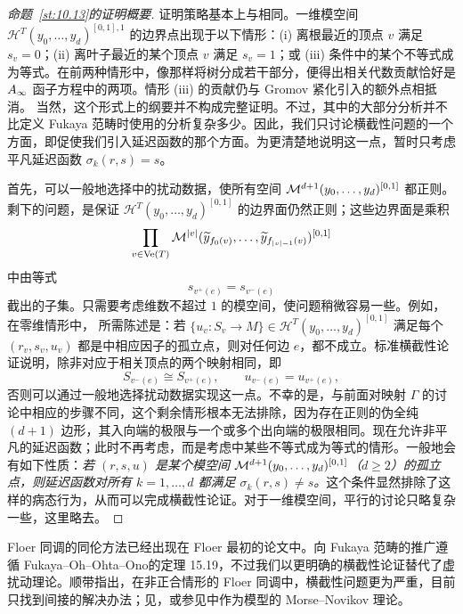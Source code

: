 \begin{proof}[命题~\ref*{st:10.13}的证明概要]
证明策略基本上与相同。一维模空间 $\mathcal H^T(y_0,\ldots,y_d)^{[0,1],1}$ 的边界点出现于以下情形：(i) 离根最近的顶点 $v$ 满足 $s_v=0$；(ii) 离叶子最近的某个顶点 $v$ 满足 $s_v=1$；或 (iii) 条件中的某个不等式成为等式。在前两种情形中，像那样将树分成若干部分，便得出相关代数贡献恰好是 $A_\infty$ 函子方程中的两项。情形 (iii) 的贡献仍与 Gromov 紧化引入的额外点相抵消。
当然，这个形式上的纲要并不构成完整证明。不过，其中的大部分分析并不比定义 Fukaya 范畴时使用的分析复杂多少。因此，我们只讨论横截性问题的一个方面，即促使我们引入延迟函数的那个方面。为更清楚地说明这一点，暂时只考虑平凡延迟函数 $\sigma_k(r,s)=s$。

首先，可以一般地选择中的扰动数据，使所有空间 $\mathcal M^{d+1}(y_0,\ldots,y_d)^{[0,1]}$ 都正则。剩下的问题，是保证 $\mathcal H^T(y_0,\ldots,y_d)^{[0,1]}$ 的边界面仍然正则；这些边界面是乘积
\begin{equation}\label{eq:10.18}
\prod_{v\in\operatorname{Ve}(T)}\mathcal M^{|v|}(\widetilde y_{f_0(v)},\ldots,\widetilde y_{f_{|v|-1}(v)})^{[0,1]}
\end{equation}
中由等式
\begin{equation}\label{eq:10.19}
s_{v^+(e)}=s_{v^-(e)}
\end{equation}
截出的子集。只需要考虑维数不超过 $1$ 的模空间，使问题稍微容易一些。例如，在零维情形中，
所需陈述是：若 $\{u_v:S_v\to M\}\in\mathcal H^T(y_0,\ldots,y_d)^{[0,1]}$ 满足每个 $(r_v,s_v,u_v)$ 都是中相应因子的孤立点，则对任何边 $e$，都不成立。标准横截性论证说明，除非对应于相关顶点的两个映射相同，即
\begin{equation}\label{eq:10.20}
S_{v^-(e)}\cong S_{v^+(e)},\qquad u_{v^-(e)}=u_{v^+(e)},
\end{equation}
否则可以通过一般地选择扰动数据实现这一点。不幸的是，与前面对映射 $\Gamma$ 的讨论中相应的步骤不同，这个剩余情形根本无法排除，因为存在正则的伪全纯 $(d+1)$ 边形，其入向端的极限与一个或多个出向端的极限相同。现在允许非平凡的延迟函数；此时不再考虑，而是考虑中某些不等式成为等式的情形。一般地会有如下性质：\emph{若 $(r,s,u)$ 是某个模空间 $\mathcal M^{d+1}(y_0,\ldots,y_d)^{[0,1]}$（$d\geq2$）的孤立点，则延迟函数对所有 $k=1,\ldots,d$ 都满足 $\sigma_k(r,s)\ne s$。}这个条件显然排除了这样的病态行为，从而可以完成横截性论证。对于一维模空间，平行的讨论只略复杂一些，这里略去。
\end{proof}
\begin{note}\label{st:10.14}
Floer 同调的同伦方法已经出现在 Floer 最初的论文中。向 Fukaya 范畴的推广遵循 Fukaya–Oh–Ohta–Ono的定理 15.19，不过我们以更明确的横截性论证替代了虚扰动理论。顺带指出，在非正合情形的 Floer 同调中，横截性问题更为严重，目前只找到间接的解决办法；见，或参见中作为模型的 Morse–Novikov 理论。
\end{note}
